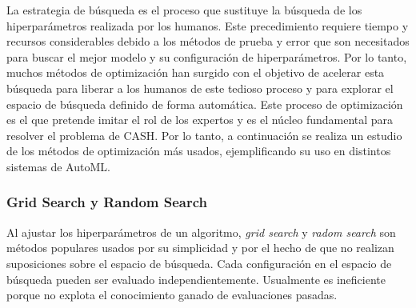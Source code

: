 La estrategia de búsqueda es el proceso que sustituye la búsqueda de los hiperparámetros realizada por los humanos. Este precedimiento requiere tiempo y recursos considerables debido a los métodos de prueba y error que son necesitados para buscar el mejor modelo y su configuración de hiperparámetros. Por lo tanto, muchos métodos de optimización han surgido con el objetivo de acelerar esta búsqueda para liberar a los humanos de este tedioso proceso y para explorar el espacio de búsqueda definido de forma automática. Este proceso de optimización es el que pretende imitar el rol de los expertos y es el núcleo fundamental para resolver el problema de CASH. Por lo tanto, a continuación se realiza un estudio de los métodos de optimización más usados, ejemplificando su uso en distintos sistemas de AutoML.


\subsubsection{Grid Search y Random Search}


Al ajustar los hiperparámetros de un algoritmo, \textit{grid search} y \textit{radom search} son métodos populares usados por su simplicidad y por el hecho de que no realizan suposiciones sobre el espacio de búsqueda. Cada configuración en el espacio de búsqueda pueden ser evaluado independientemente. Usualmente es ineficiente porque no explota el conocimiento ganado de evaluaciones pasadas.

